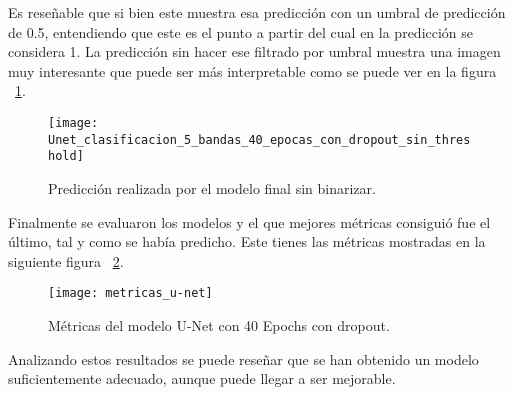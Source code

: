 Es reseñable que si bien este muestra esa predicción con un umbral de predicción de 0.5, entendiendo que este es el punto a partir del cual en la predicción se considera 1. La predicción sin hacer ese filtrado por umbral muestra una imagen muy interesante que puede ser más interpretable como se puede ver en la figura ~\ref{fig:prediccion_sin_umbral}.
	
\begin{figure}[H]
	\centering
	\texttt{[image: Unet\_clasificacion\_5\_bandas\_40\_epocas\_con\_dropout\_sin\_threshold]}
	\caption[Predicción realizada por el modelo final sin binarizar]{Predicción realizada por el modelo final sin binarizar.}
	\label{fig:prediccion_sin_umbral}
\end{figure}

Finalmente se evaluaron los modelos y el que mejores métricas consiguió fue el último, tal y como se había predicho. Este tienes las métricas mostradas en la siguiente figura  ~\ref{fig:metricas_u-net}.

\begin{figure}[H]
	\centering
	\texttt{[image: metricas\_u-net]}
	\caption[Métricas del modelo U-Net con 40 Epochs]{Métricas del modelo U-Net con 40 Epochs con dropout.}
	\label{fig:metricas_u-net}
\end{figure}

Analizando estos resultados se puede reseñar que se han obtenido un modelo suficientemente adecuado, aunque puede llegar a ser mejorable.